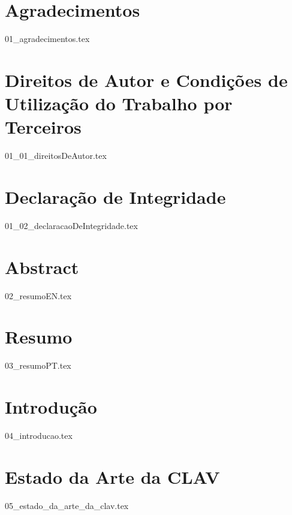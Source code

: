 \documentclass[
  oneside,
  11pt, a4paper,
  footinclude=true,
  headinclude=true,
  cleardoublepage=empty
]{scrbook}
\author{José Carlos Lima Martins}
\date{\myear} %
\begin{document}
    \umfrontcover{}
    \umtitlepage{}
	
	\chapter*{Agradecimentos}
    {01_agradecimentos.tex}

    \chapter*{Direitos de Autor e Condições de Utilização do Trabalho por Terceiros}
    {01_01_direitosDeAutor.tex}

    \chapter*{Declaração de Integridade}
    {01_02_declaracaoDeIntegridade.tex}

	\chapter*{Abstract}
    {02_resumoEN.tex}
	
    \cleardoublepage{}
	\chapter*{Resumo}
    {03_resumoPT.tex}

	\tableofcontents
	\listoffigures
	\listoftables
	\lstlistoflistings
    \printglossary[type=\acronymtype, title={Lista de Acrónimos}, style=treenoname]
	
	
    \chapter{Introdução}
    {04_introducao.tex}

	\chapter{Estado da Arte da CLAV}
    {05_estado_da_arte_da_clav.tex}
\end{document}
